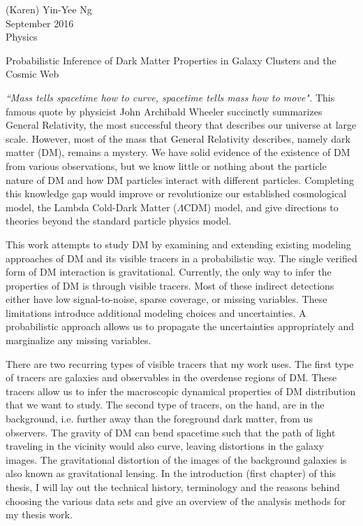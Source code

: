 		\begin{flushright}
			(Karen) Yin-Yee Ng \\
			September 2016 \\
			Physics \\
		\end{flushright}

		\begin{center}
			Probabilistic Inference of Dark Matter Properties in Galaxy Clusters and
			the Cosmic Web\\
		\end{center}

		{\it ``Mass tells spacetime how to curve, spacetime tells mass how to move".}
		This famous quote by physicist John Archibald Wheeler succinctly summarizes General
		Relativity,  the most successful theory that describes our universe
		at large scale. However, most of the mass that General Relativity describes,
		namely dark matter (DM), remains a mystery.  
		We have solid evidence of the existence of DM from various
		observations, but we know little or nothing about the particle nature of DM
		and how DM particles interact with different particles. 
		Completing this knowledge gap would improve or 
		revolutionize our established cosmological model,
		the Lambda Cold-Dark Matter	($\Lambda$CDM) model, 
		and give directions to theories beyond the standard particle
		physics model. 

			This work attempts to study DM by examining and
		extending existing modeling approaches of DM and its visible tracers in a
		probabilistic way. The single verified form of 
		DM interaction is gravitational. Currently, the 
		only way to infer the properties of DM is through visible tracers. Most of 
		these indirect detections	either have low signal-to-noise, sparse coverage, 
		or missing
		variables. These limitations introduce additional
		modeling choices and uncertainties. A probabilistic approach allows us to
		propagate the uncertainties appropriately and marginalize any 
		missing variables. 	
		
		There are two recurring types of visible tracers that 
		my work uses. The first type of tracers are galaxies and observables in the 
		 overdense regions of DM. These tracers allow 
		us to infer the macroscopic dynamical properties of DM distribution that 
		we want to study. The
		second type of tracers, on the hand, are in the background, i.e.
		further away than the foreground dark matter, from us observers. The
		gravity of DM can bend spacetime such that the path of light traveling in 
		the vicinity would also curve, leaving distortions in the galaxy images. 
		The gravitational distortion of the images 
		of the background galaxies is also known as gravitational lensing. In the
		introduction (first chapter) of this thesis, I will lay out the technical
		history, terminology and the reasons behind choosing the various data sets
		and give an overview of the analysis methods for my thesis work. 
		
